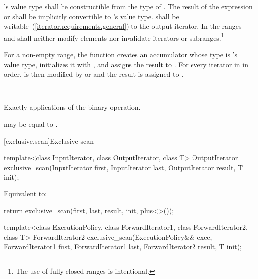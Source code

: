 \begin{itemdescr}
\pnum
\requires
{}'s value type shall be constructible from the type of .
The result of the expression  or  shall be
implicitly convertible to 's value type. 
shall be writable~(\ref{iterator.requirements.general}) to the  output iterator.
In the ranges
and
shall neither modify elements nor invalidate iterators or subranges.\footnote{The use of fully closed ranges is intentional.
}

\pnum
\effects For a non-empty range,
the function creates an accumulator  whose type is 's
value type, initializes it with ,
and assigns the result to . For every iterator  in 
in order,  is then modified by  or 
and the result is assigned to .

\pnum
\returns
{}.

\pnum
\complexity
Exactly
applications of
the binary operation.

\pnum
\remarks
{}
may be equal to
.
\end{itemdescr}

[exclusive.scan]{Exclusive scan}

%
\begin{itemdecl}
template<class InputIterator, class OutputIterator, class T>
  OutputIterator exclusive_scan(InputIterator first, InputIterator last,
                                OutputIterator result,
                                T init);
\end{itemdecl}

\begin{itemdescr}
\pnum
\effects Equivalent to:
\begin{codeblock}
return exclusive_scan(first, last, result, init, plus<>());
\end{codeblock}
\end{itemdescr}

%
\begin{itemdecl}
template<class ExecutionPolicy, class ForwardIterator1, class ForwardIterator2, class T>
  ForwardIterator2 exclusive_scan(ExecutionPolicy&& exec,
                                  ForwardIterator1 first, ForwardIterator1 last,
                                  ForwardIterator2 result,
                                  T init);
\end{itemdecl}

